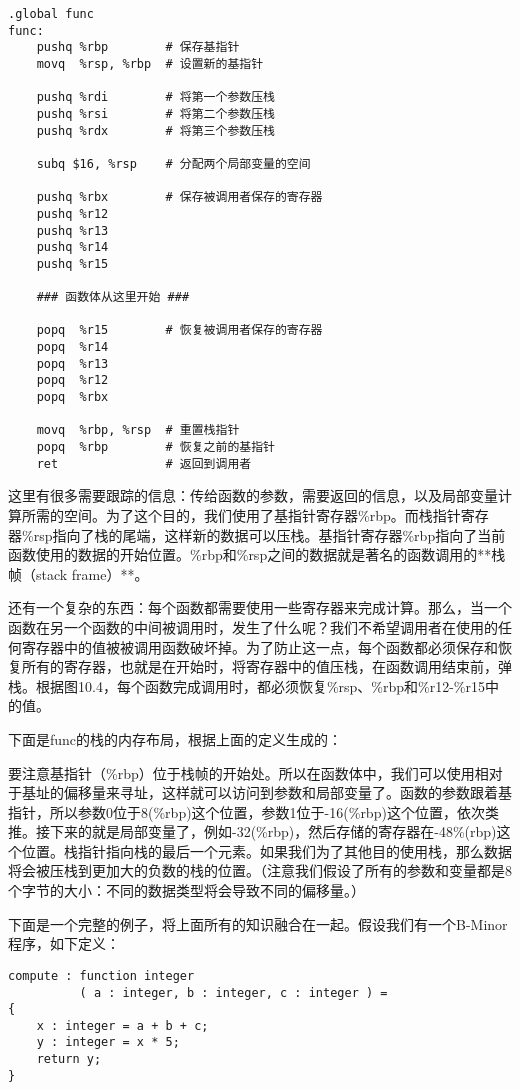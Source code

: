 \documentclass[cn,11pt,chinese]{elegantbook}
\begin{document}
\begin{verbatim}
.global func
func:
    pushq %rbp        # 保存基指针
    movq  %rsp, %rbp  # 设置新的基指针
    
    pushq %rdi        # 将第一个参数压栈
    pushq %rsi        # 将第二个参数压栈
    pushq %rdx        # 将第三个参数压栈
    
    subq $16, %rsp    # 分配两个局部变量的空间
    
    pushq %rbx        # 保存被调用者保存的寄存器
    pushq %r12
    pushq %r13
    pushq %r14
    pushq %r15
    
    ### 函数体从这里开始 ###
    
    popq  %r15        # 恢复被调用者保存的寄存器
    popq  %r14
    popq  %r13
    popq  %r12
    popq  %rbx
    
    movq  %rbp, %rsp  # 重置栈指针
    popq  %rbp        # 恢复之前的基指针
    ret               # 返回到调用者
\end{verbatim}

这里有很多需要跟踪的信息：传给函数的参数，需要返回的信息，以及局部变量计算所需的空间。为了这个目的，我们使用了基指针寄存器\%rbp。而栈指针寄存器\%rsp指向了栈的尾端，这样新的数据可以压栈。基指针寄存器\%rbp指向了当前函数使用的数据的开始位置。\%rbp和\%rsp之间的数据就是著名的函数调用的**栈帧（stack frame）**。

还有一个复杂的东西：每个函数都需要使用一些寄存器来完成计算。那么，当一个函数在另一个函数的中间被调用时，发生了什么呢？我们不希望调用者在使用的任何寄存器中的值被被调用函数破坏掉。为了防止这一点，每个函数都必须保存和恢复所有的寄存器，也就是在开始时，将寄存器中的值压栈，在函数调用结束前，弹栈。根据图10.4，每个函数完成调用时，都必须恢复\%rsp、\%rbp和\%r12-\%r15中的值。

下面是func的栈的内存布局，根据上面的定义生成的：

要注意基指针（\%rbp）位于栈帧的开始处。所以在函数体中，我们可以使用相对于基址的偏移量来寻址，这样就可以访问到参数和局部变量了。函数的参数跟着基指针，所以参数0位于8(\%rbp)这个位置，参数1位于-16(\%rbp)这个位置，依次类推。接下来的就是局部变量了，例如-32(\%rbp)，然后存储的寄存器在-48\%(rbp)这个位置。栈指针指向栈的最后一个元素。如果我们为了其他目的使用栈，那么数据将会被压栈到更加大的负数的栈的位置。（注意我们假设了所有的参数和变量都是8个字节的大小：不同的数据类型将会导致不同的偏移量。）

下面是一个完整的例子，将上面所有的知识融合在一起。假设我们有一个B-Minor程序，如下定义：

\begin{verbatim}
compute : function integer
          ( a : integer, b : integer, c : integer ) =
{
    x : integer = a + b + c;
    y : integer = x * 5;
    return y;
}
\end{verbatim}
\end{document}
